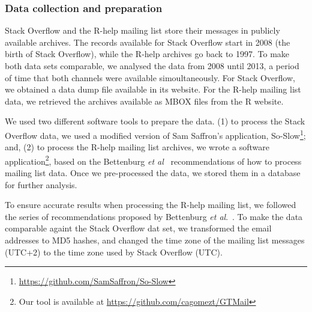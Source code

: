 \documentclass{sig-alternate-05-2015}
\begin{document}
\subsubsection{Data collection and preparation}
\label{subsec:preparation}

	Stack Overflow and the R-help mailing list store their messages in publicly available archives.
	The records available for Stack Overflow start in 2008 (the birth of Stack Overflow), while the R-help archives go back to 1997.
	To make both data sets comparable, we analysed the data from 2008 until 2013, a period of time that both channels were available simoultaneously.
For Stack Overflow, we obtained a data dump file available in its website.
For the R-help mailing list data, we retrieved the archives available as MBOX files from the R website.

	We used two different software tools to prepare the data.
	(1) to process the Stack Overflow data, we used a modified version of Sam Saffron's application, So-Slow\footnote{\url{https://github.com/SamSaffron/So-Slow}}; and,
	(2) to process the R-help mailing list archives, we wrote a software application\footnote{Our tool is available at \url{https://github.com/cagomezt/GTMail}}, based on the Bettenburg \textit{et al}~\cite{Bettenburg2009} recommendations of how to process mailing list data.
    Once we pre-processed the data, we stored them in a database for further analysis.



To ensure accurate results when processing the R-help mailing list, we followed the series of recommendations proposed by Bettenburg \textit{et al}.~\cite{Bettenburg2009}.
To make the data comparable againt the Stack Overflow dat set, we transformed the email addresses to MD5 hashes, and changed the time zone of the mailing list messages (UTC+2) to the time zone used by Stack Overflow (UTC).
\end{document}
